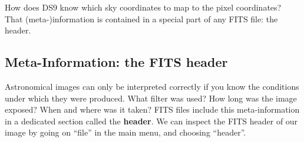 \documentclass[twocolumn,apj]{openjournal}
\begin{document}
How does DS9 know which sky coordinates to map to the pixel coordinates? That (meta-)information is contained in a special part of any FITS file: the header. 

\subsection{Meta-Information: the FITS header}

Astronomical images can only be interpreted correctly if you know the conditions under which they were produced. What filter was used? How long was the image exposed? When and where was it taken? FITS files include this meta-information in a dedicated section called the {\bf header}. We can inspect the FITS header of our image by going on ``file'' in the main menu, and choosing ``header''.
\end{document}
